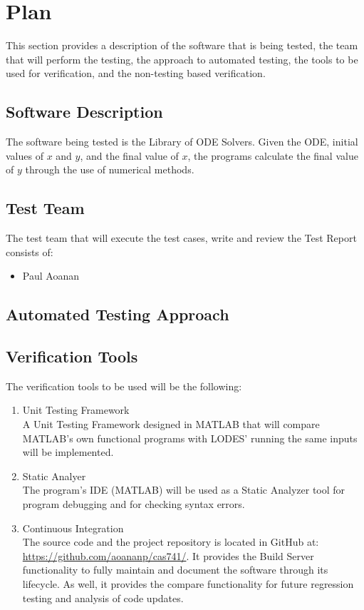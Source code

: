 \documentclass[12pt, titlepage]{article}
\newcommand{\famname}{LODES} %
\newcommand{\famdesc}{Library of ODE Solvers}
\newcommand{\famurl}{https://github.com/aoananp/cas741/}
\begin{document}
\section{Plan}
This section provides a description of the software that is being tested, the team that will
perform the testing, the approach to automated testing, the tools to be used for verification, and the non-testing based verification. 
	
\subsection{Software Description}
The software being tested is the \famdesc{}. Given the ODE, initial values of $x$ and $y$, and the final value of $x$,
the programs calculate the final value of $y$ through the use of numerical methods.

\subsection{Test Team}

The test team that will execute the test cases, write and review the Test Report consists of:
\begin{itemize}
 \item Paul Aoanan
\end{itemize} 

\subsection{Automated Testing Approach}



\subsection{Verification Tools}
The verification tools to be used will be the following:

\begin{enumerate}
\item{Unit Testing Framework\\}
A Unit Testing Framework designed in MATLAB that will compare MATLAB's own functional programs
with
\famname{}' running the same inputs will be implemented.

\item{Static Analyer\\}
The program's IDE (MATLAB) will be used as a Static Analyzer tool for program debugging and
for checking syntax errors.

\item{Continuous Integration\\}
The source code and the project repository is located in GitHub at: \url{\famurl}.
It provides the Build Server functionality to fully maintain and document the software through its lifecycle.
As well, it provides the compare functionality for future regression testing and analysis of code updates.

\end{enumerate}
\end{document}
